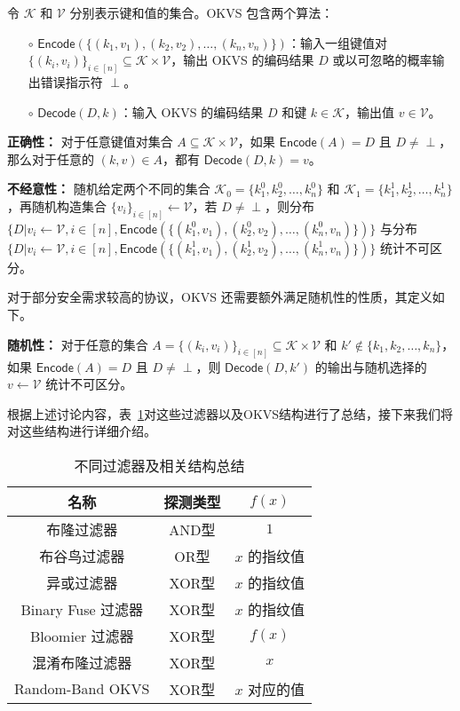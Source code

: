 \begin{definition}
    令 $\mathcal{K}$ 和 $\mathcal{V}$ 分别表示键和值的集合。OKVS 包含两个算法：
    \begin{itemize}
        \item[$\circ$] $\mathsf{Encode}(\{(k_1, v_1), (k_2, v_2), \dots, (k_n, v_n)\})$：输入一组键值对 $\{(k_i, v_i)\}_{i\in [n]}\subseteq \mathcal{K} \times \mathcal{V}$，输出 OKVS 的编码结果 $D$ 或以可忽略的概率输出错误指示符 $\perp$。
        \item[$\circ$] $\mathsf{Decode}(D, k)$：输入 OKVS 的编码结果 $D$ 和键 $k\in \mathcal{K}$，输出值 $v\in \mathcal{V}$。
    \end{itemize}

    \textbf{正确性：} 对于任意键值对集合 $A\subseteq \mathcal{K}\times \mathcal{V}$，如果 $\mathsf{Encode}(A) = D$ 且 $D\neq \perp$，那么对于任意的 $(k, v) \in A$，都有 $\mathsf{Decode}(D, k) = v$。

    \textbf{不经意性：} 随机给定两个不同的集合 $\mathcal{K}_0 = \{k_1^0, k_2^0, \dots, k_n^0\}$ 和 $\mathcal{K}_1 = \{k_1^1, k_2^1, \dots, k_n^1\}$，再随机构造集合 $\{v_i\}_{i\in [n]}\gets \mathcal{V}$，若 $D \neq \perp$，则分布 $\{D | v_i \gets \mathcal{V}, i\in [n], \mathsf{Encode}(\{(k_1^0, v_1), (k_2^0, v_2), \dots, (k_n^0, v_n)\})\}$ 与分布 $\{D | v_i \gets \mathcal{V}, i\in [n], \mathsf{Encode}(\{(k_1^1, v_1), (k_2^1, v_2), \dots, (k_n^1, v_n)\})\}$ 统计不可区分。

    对于部分安全需求较高的协议，OKVS 还需要额外满足随机性的性质，其定义如下。

    \textbf{随机性：} 对于任意的集合 $A = \{(k_i, v_i)\}_{i\in [n]} \subseteq \mathcal{K} \times \mathcal{V}$ 和 $k' \notin \{k_1, k_2, \dots, k_n\}$，如果 $\mathsf{Encode}(A) = D$ 且 $D\neq \perp$，则 $\mathsf{Decode}(D, k')$ 的输出与随机选择的 $v\gets \mathcal{V}$ 统计不可区分。
\end{definition}

根据上述讨论内容，表~\ref{tab:construct}对这些过滤器以及OKVS结构进行了总结，接下来我们将对这些结构进行详细介绍。

\begin{table}
  \centering
  \caption{不同过滤器及相关结构总结}
  \label{tab:construct}
  \begin{tabular}{ccc}
    \toprule
    名称  &  探测类型  &  $f(x)$  \\
    \midrule
    布隆过滤器  &  AND型  &  $1$  \\
    布谷鸟过滤器  &  OR型  &  $x$ 的指纹值  \\
    异或过滤器  &  XOR型  &  $x$ 的指纹值  \\
    Binary Fuse 过滤器  & XOR型  &  $x$ 的指纹值  \\
    Bloomier 过滤器  &  XOR型  &  $f(x)$  \\
    混淆布隆过滤器  &  XOR型  &  $x$  \\
    Random-Band OKVS &  XOR型  &  $x$ 对应的值  \\
    \bottomrule
  \end{tabular}
\end{table}
